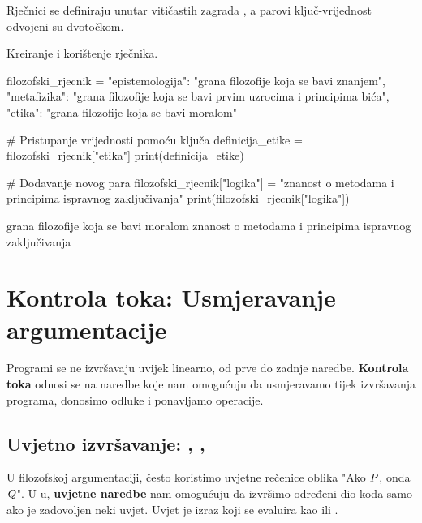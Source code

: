 Rječnici se definiraju unutar vitičastih zagrada \pyinline{{}}, a parovi ključ-vrijednost odvojeni su dvotočkom.

\begin{primjerokvir}
    Kreiranje i korištenje rječnika.
    \begin{pythoncode}
filozofski_rjecnik = {
    "epistemologija": "grana filozofije koja se bavi znanjem",
    "metafizika": "grana filozofije koja se bavi prvim uzrocima i principima bića",
    "etika": "grana filozofije koja se bavi moralom"
}

# Pristupanje vrijednosti pomoću ključa
definicija_etike = filozofski_rjecnik["etika"]
print(definicija_etike)

# Dodavanje novog para
filozofski_rjecnik["logika"] = "znanost o metodama i principima ispravnog zaključivanja"
print(filozofski_rjecnik["logika"])
    \end{pythoncode}
    \begin{codeoutput}
grana filozofije koja se bavi moralom
znanost o metodama i principima ispravnog zaključivanja
    \end{codeoutput}
\end{primjerokvir}

\section{Kontrola toka: Usmjeravanje argumentacije}
\label{sec:kontrola_toka}

Programi se ne izvršavaju uvijek linearno, od prve do zadnje naredbe. \textbf{Kontrola toka} odnosi se na naredbe koje nam omogućuju da usmjeravamo tijek izvršavanja programa, donosimo odluke i ponavljamo operacije.

\subsection{Uvjetno izvršavanje: , , }

U filozofskoj argumentaciji, često koristimo uvjetne rečenice oblika "Ako $\mathit{P}$, onda $\mathit{Q}$". U u, \textbf{uvjetne naredbe} nam omogućuju da izvršimo određeni dio koda samo ako je zadovoljen neki uvjet. Uvjet je izraz koji se evaluira kao  ili .

